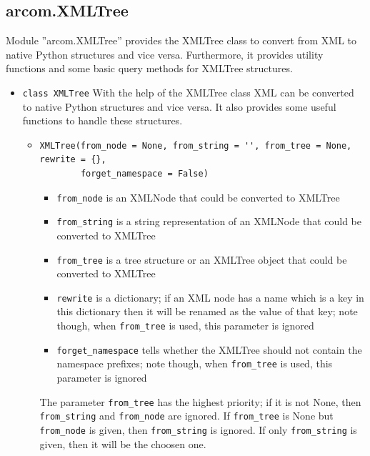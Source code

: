 \documentclass{article}
\begin{document}
\subsection{arcom.XMLTree}
\label{axtree}
Module ''arcom.XMLTree'' provides the XMLTree class to convert from XML to native Python structures and vice versa.
Furthermore, it provides utility functions and some basic query methods for XMLTree structures.
\begin{flushleft}

\begin{itemize}
  \item{ \verb$class XMLTree$ \linebreak
    With the help of the XMLTree class XML can be converted to native Python structures and vice versa.
    It also provides some useful functions to handle these structures.
    \begin{itemize}
      \item{\begin{verbatim}
XMLTree(from_node = None, from_string = '', from_tree = None, rewrite = {}, 
        forget_namespace = False) \end{verbatim}
        \begin{itemize}
          \item{\verb$from_node$ is an XMLNode that could be converted to XMLTree}
          \item{\verb$from_string$ is a string representation of an XMLNode that could be converted to XMLTree}
          \item{\verb$from_tree$ is a tree structure or an XMLTree object that could be converted to XMLTree}
          \item{\verb$rewrite$ is a dictionary; if an XML node has a name which is a key 
                in this dictionary then it will be renamed as the value of that key; note though, 
                when \verb$from_tree$ is used, this parameter is ignored}
          \item{\verb$forget_namespace$ tells whether the XMLTree should not contain the namespace prefixes; 
                note though, when \verb$from_tree$ is used, this parameter is ignored}
        \end{itemize}
        The parameter \verb$from_tree$ has the highest priority; if it is not None, then \verb$from_string$ and 
        \verb$from_node$ are ignored. If \verb$from_tree$ is None but \verb$from_node$ is given, 
        then \verb$from_string$ is ignored. If only \verb$from_string$ is given, then it will be the choosen one.
}
\end{itemize}}
\end{itemize}
\end{flushleft}
\end{document}
